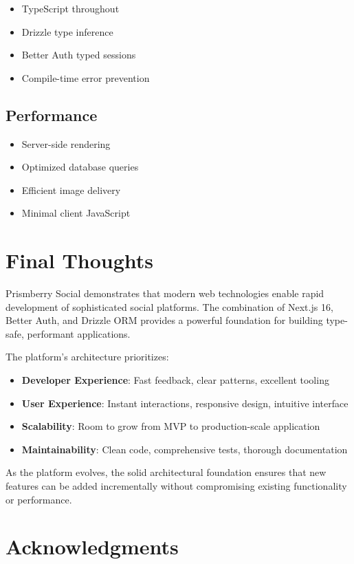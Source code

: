 \documentclass[12pt,a4paper]{report}
\begin{document}
\begin{itemize}
    \item TypeScript throughout
    \item Drizzle type inference
    \item Better Auth typed sessions
    \item Compile-time error prevention
\end{itemize}

\subsection{Performance}

\begin{itemize}
    \item Server-side rendering
    \item Optimized database queries
    \item Efficient image delivery
    \item Minimal client JavaScript
\end{itemize}

\section{Final Thoughts}

Prismberry Social demonstrates that modern web technologies enable rapid development of sophisticated social platforms. The combination of Next.js 16, Better Auth, and Drizzle ORM provides a powerful foundation for building type-safe, performant applications.

The platform's architecture prioritizes:
\begin{itemize}
    \item \textbf{Developer Experience}: Fast feedback, clear patterns, excellent tooling
    \item \textbf{User Experience}: Instant interactions, responsive design, intuitive interface
    \item \textbf{Scalability}: Room to grow from MVP to production-scale application
    \item \textbf{Maintainability}: Clean code, comprehensive tests, thorough documentation
\end{itemize}

As the platform evolves, the solid architectural foundation ensures that new features can be added incrementally without compromising existing functionality or performance.

\section{Acknowledgments}
\end{document}
